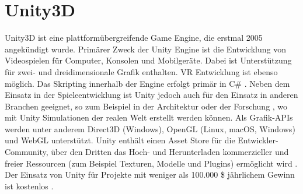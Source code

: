 

\section{Unity3D}
Unity3D ist eine plattformübergreifende Game Engine, die erstmal 2005 angekündigt wurde.
Primärer Zweck der Unity Engine ist die Entwicklung von Videospielen für Computer, Konsolen und Mobilgeräte.
Dabei ist Unterstützung für zwei- und dreidimensionale Grafik enthalten.
VR Entwicklung ist ebenso möglich.
Das Skripting innerhalb der Engine erfolgt primär in C\# \cite{freecodecamp.unityIntroduction}.
Neben dem Einsatz in der Spieleentwicklung ist Unity jedoch auch für den Einsatz in anderen Branchen geeignet, so zum Beispiel in der Architektur oder der Forschung \cite[30]{waidner.2020}, wo mit Unity Simulationen der realen Welt erstellt werden können.
Als Grafik-APIs werden unter anderem Direct3D (Windows), OpenGL (Linux, macOS, Windows) und WebGL unterstützt.
Unity enthält einen Asset Store für die Entwickler-Community, über den Dritten das Hoch- und Herunterladen kommerzieller und freier Ressourcen (zum Beispiel Texturen, Modelle und Plugins) ermöglicht wird \cite{freecodecamp.unityIntroduction}.
Der Einsatz von Unity für Projekte mit weniger als 100.000 \$ jährlichem Gewinn ist kostenlos \cite{unityPersonal}.


